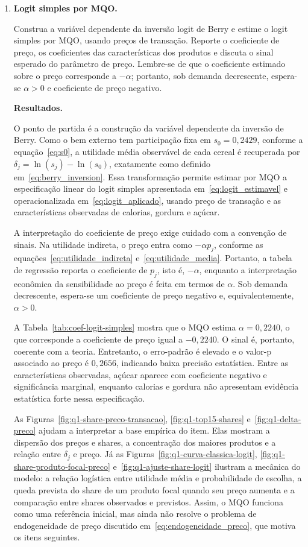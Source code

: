 \documentclass[12pt,a4paper]{article}
\begin{document}
\begin{enumerate}

\item \textbf{Logit simples por MQO.}

Construa a variável dependente da inversão logit de Berry e estime o logit simples por MQO, usando preços de transação. Reporte o coeficiente de preço, os coeficientes das características dos produtos e discuta o sinal esperado do parâmetro de preço. Lembre-se de que o coeficiente estimado sobre o preço corresponde a \(-\alpha\); portanto, sob demanda decrescente, espera-se \(\alpha>0\) e coeficiente de preço negativo.

\textbf{Resultados.}

O ponto de partida é a construção da variável dependente da inversão de Berry. Como o bem externo tem participação fixa em \(s_0=0{,}2429\), conforme a equação~\eqref{eq:s0}, a utilidade média observável de cada cereal é recuperada por \(\delta_j=\ln(s_j)-\ln(s_0)\), exatamente como definido em~\eqref{eq:berry_inversion}. Essa transformação permite estimar por MQO a especificação linear do logit simples apresentada em~\eqref{eq:logit_estimavel} e operacionalizada em~\eqref{eq:logit_aplicado}, usando preço de transação e as características observadas de calorias, gordura e açúcar.

A interpretação do coeficiente de preço exige cuidado com a convenção de sinais. Na utilidade indireta, o preço entra como \(-\alpha p_j\), conforme as equações~\eqref{eq:utilidade_indireta} e~\eqref{eq:utilidade_media}. Portanto, a tabela de regressão reporta o coeficiente de \(p_j\), isto é, \(-\alpha\), enquanto a interpretação econômica da sensibilidade ao preço é feita em termos de \(\alpha\). Sob demanda decrescente, espera-se um coeficiente de preço negativo e, equivalentemente, \(\alpha>0\).

A Tabela~\ref{tab:coef-logit-simples} mostra que o MQO estima \(\alpha=0{,}2240\), o que corresponde a coeficiente de preço igual a \(-0{,}2240\). O sinal é, portanto, coerente com a teoria. Entretanto, o erro-padrão é elevado e o valor-p associado ao preço é \(0{,}2656\), indicando baixa precisão estatística. Entre as características observadas, açúcar aparece com coeficiente negativo e significância marginal, enquanto calorias e gordura não apresentam evidência estatística forte nessa especificação.

As Figuras~\ref{fig:q1-share-preco-transacao}, \ref{fig:q1-top15-shares} e~\ref{fig:q1-delta-preco} ajudam a interpretar a base empírica do item. Elas mostram a dispersão dos preços e shares, a concentração dos maiores produtos e a relação entre \(\delta_j\) e preço. Já as Figuras~\ref{fig:q1-curva-classica-logit}, \ref{fig:q1-share-produto-focal-preco} e~\ref{fig:q1-ajuste-share-logit} ilustram a mecânica do modelo: a relação logística entre utilidade média e probabilidade de escolha, a queda prevista do share de um produto focal quando seu preço aumenta e a comparação entre shares observados e previstos. Assim, o MQO funciona como uma referência inicial, mas ainda não resolve o problema de endogeneidade de preço discutido em~\eqref{eq:endogeneidade_preco}, que motiva os itens seguintes.


\end{enumerate}
\end{document}
